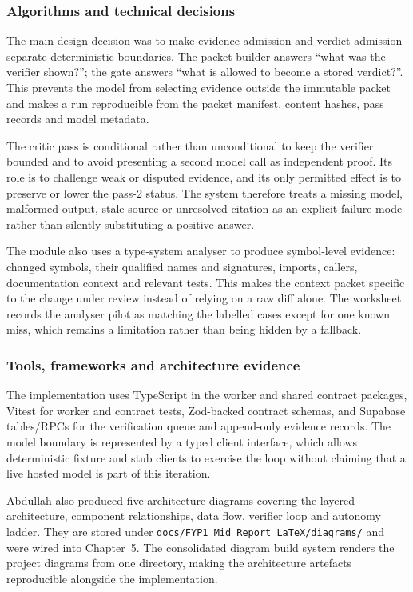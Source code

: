 \subsubsection{Algorithms and technical decisions}

The main design decision was to make evidence admission and verdict admission
separate deterministic boundaries. The packet builder answers ``what was the
verifier shown?''; the gate answers ``what is allowed to become a stored
verdict?''. This prevents the model from selecting evidence outside the
immutable packet and makes a run reproducible from the packet manifest,
content hashes, pass records and model metadata.

The critic pass is conditional rather than unconditional to keep the verifier
bounded and to avoid presenting a second model call as independent proof. Its
role is to challenge weak or disputed evidence, and its only permitted effect
is to preserve or lower the pass-2 status. The system therefore treats a
missing model, malformed output, stale source or unresolved citation as an
explicit failure mode rather than silently substituting a positive answer.

The module also uses a type-system analyser to produce symbol-level evidence:
changed symbols, their qualified names and signatures, imports, callers,
documentation context and relevant tests. This makes the context packet
specific to the change under review instead of relying on a raw diff alone.
The worksheet records the analyser pilot as matching the labelled cases except
for one known miss, which remains a limitation rather than being hidden by a
fallback.

\subsubsection{Tools, frameworks and architecture evidence}

The implementation uses TypeScript in the worker and shared contract
packages, Vitest for worker and contract tests, Zod-backed contract schemas,
and Supabase tables/RPCs for the verification queue and append-only evidence
records. The model boundary is represented by a typed client interface, which
allows deterministic fixture and stub clients to exercise the loop without
claiming that a live hosted model is part of this iteration.

Abdullah also produced five architecture diagrams covering the layered
architecture, component relationships, data flow, verifier loop and autonomy
ladder. They are stored under
\texttt{docs/FYP1 Mid Report LaTeX/diagrams/} and were wired into Chapter~5.
The consolidated diagram build system renders the project diagrams from one
directory, making the architecture artefacts reproducible alongside the
implementation.

